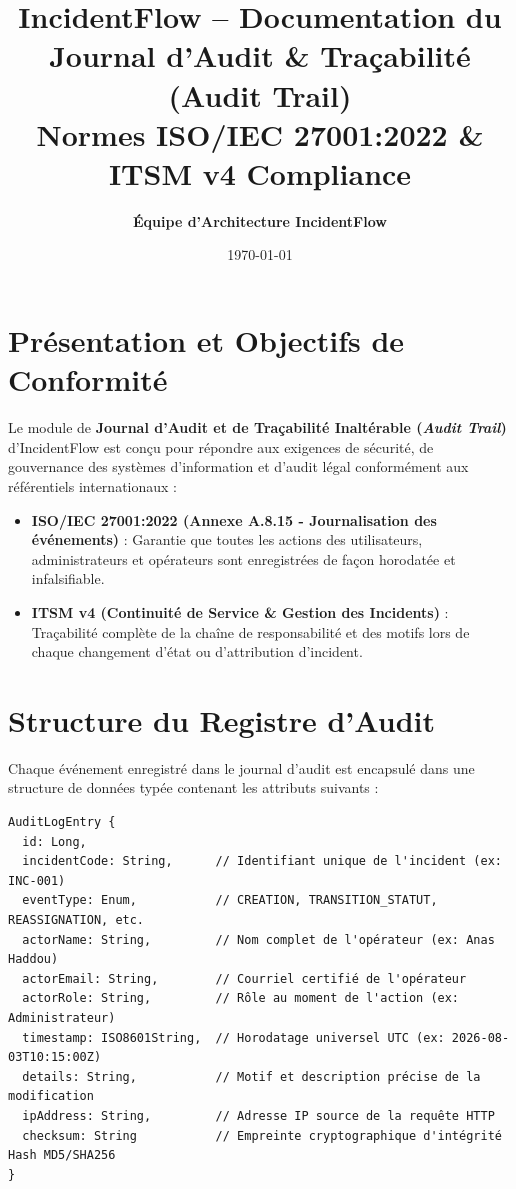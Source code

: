 \documentclass[11pt,a4paper]{article}
\title{\textbf{\Large IncidentFlow -- Documentation du Journal d'Audit \& Traçabilité (Audit Trail)}\\\large Normes ISO/IEC 27001:2022 \& ITSM v4 Compliance}
\author{\textbf{Équipe d'Architecture IncidentFlow}}
\date{\today}
\begin{document}
\maketitle

\section{Présentation et Objectifs de Conformité}

Le module de \textbf{Journal d'Audit et de Traçabilité Inaltérable (\textit{Audit Trail})} d'IncidentFlow est conçu pour répondre aux exigences de sécurité, de gouvernance des systèmes d'information et d'audit légal conformément aux référentiels internationaux :
\begin{itemize}
    \item \textbf{ISO/IEC 27001:2022 (Annexe A.8.15 - Journalisation des événements)} : Garantie que toutes les actions des utilisateurs, administrateurs et opérateurs sont enregistrées de façon horodatée et infalsifiable.
    \item \textbf{ITSM v4 (Continuité de Service \& Gestion des Incidents)} : Traçabilité complète de la chaîne de responsabilité et des motifs lors de chaque changement d'état ou d'attribution d'incident.
\end{itemize}

\section{Structure du Registre d'Audit}

Chaque événement enregistré dans le journal d'audit est encapsulé dans une structure de données typée contenant les attributs suivants :

\begin{verbatim}
AuditLogEntry {
  id: Long,
  incidentCode: String,      // Identifiant unique de l'incident (ex: INC-001)
  eventType: Enum,           // CREATION, TRANSITION_STATUT, REASSIGNATION, etc.
  actorName: String,         // Nom complet de l'opérateur (ex: Anas Haddou)
  actorEmail: String,        // Courriel certifié de l'opérateur
  actorRole: String,         // Rôle au moment de l'action (ex: Administrateur)
  timestamp: ISO8601String,  // Horodatage universel UTC (ex: 2026-08-03T10:15:00Z)
  details: String,           // Motif et description précise de la modification
  ipAddress: String,         // Adresse IP source de la requête HTTP
  checksum: String           // Empreinte cryptographique d'intégrité Hash MD5/SHA256
}
\end{verbatim}
\end{document}
